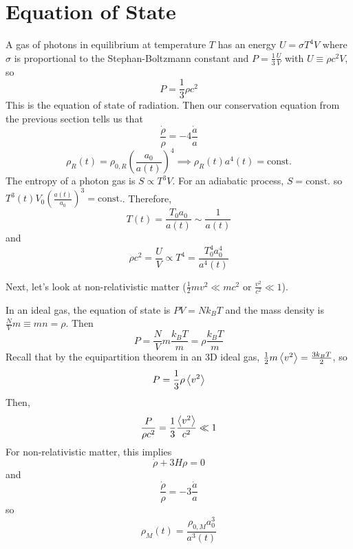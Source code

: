 \documentclass[a4paper,twoside,master.tex]{subfiles}
\begin{document}
\section{Equation of State}\label{sec:equation_of_state}

A gas of photons in equilibrium at temperature $ T $ has an energy $ U = \sigma T^4 V $ where $ \sigma $ is proportional to the Stephan-Boltzmann constant and $ P = \frac{1}{3} \frac{U}{V} $ with $ U \equiv \rho c^2 V $, so
\begin{equation}
    P = \frac{1}{3} \rho c^2
\end{equation}
This is the equation of state of radiation. Then our conservation equation from the previous section tells us that
\begin{equation}
    \frac{\dot{\rho}}{\rho} = - 4 \frac{\dot{a}}{a}
\end{equation}
\begin{equation}
    \rho_R(t) = \rho_{0,R} \left( \frac{a_0}{a(t)} \right)^4 \implies \rho_R(t) a^4(t) = \text{const.}
\end{equation}
The entropy of a photon gas is $ S \propto T^3 V $. For an adiabatic process, $ S = \text{const.} $ so $ T^3(t) V_0 \left( \frac{a(t)}{a_0} \right)^3 = \text{const.} $. Therefore,
\begin{equation}
    T(t) = \frac{T_0 a_0}{a(t)} \sim \frac{1}{a(t)}
\end{equation}
and
\begin{equation}
    \rho c^2 = \frac{U}{V} \propto T^4 = \frac{T_0^4 a_0^4}{a^4(t)}
\end{equation}

Next, let's look at non-relativistic matter ($ \frac{1}{2} m v^2 \ll m c^2 $ or $ \frac{v^2}{c^2} \ll 1 $).

In an ideal gas, the equation of state is $ PV = N k_B T $ and the mass density is $ \frac{N}{V} m \equiv m n = \rho $. Then
\begin{equation}
    P = \frac{N}{V} m \frac{k_B T}{m} = \rho \frac{k_B T}{m}
\end{equation}
Recall that by the equipartition theorem in an 3D ideal gas, $ \frac{1}{2} m \ev{v^2} = \frac{3 k_B T}{2} $, so
\begin{equation}
    P = \frac{1}{3} \rho \ev{v^2}
\end{equation}
Then,
\begin{equation}
    \frac{P}{\rho c^2} = \frac{1}{3} \frac{\ev{v^2}}{c^2} \ll 1
\end{equation}
For non-relativistic matter, this implies
\begin{equation}
    \dot{\rho} + 3 H \rho = 0
\end{equation}
and
\begin{equation}
    \frac{\dot{\rho}}{\rho} = -3 \frac{\dot{a}}{a}
\end{equation}
so
\begin{equation}
    \rho_M(t) = \frac{\rho_{0,M} a_0^3}{a^3(t)}
\end{equation}
\end{document}
